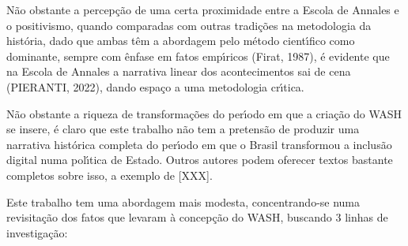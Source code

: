 \documentclass[
12pt,		%
openright,	%
twoside,  %
a4paper,			%
chapter=TITLE,		%
english,			%
french,				%
spanish,			%
brazil				%
]{USPSC-classe/USPSC_RedarTex}
\begin{document}
\noindent\begin{center}\mbox{\centering{}}\end{center}


N\~ao obstante a percep\c{c}\~ao de uma certa proximidade entre a Escola de Annales e o positivismo, quando comparadas com outras tradi\c{c}\~oes na metodologia da hist\'oria, dado que ambas t\^em a abordagem pelo m\'etodo cient\'{\i}fico como dominante, sempre com \^enfase em fatos emp\'{\i}ricos (Firat, 1987), \'e evidente que na Escola de Annales a narrativa linear dos acontecimentos sai de cena (PIERANTI, 2022), dando espa\c{c}o a uma metodologia cr\'{\i}tica.










N\~ao obstante a riqueza de transforma\c{c}\~oes do per\'{\i}odo em que a cria\c{c}\~ao do WASH se insere, \'e claro que este trabalho n\~ao tem a pretens\~ao de produzir uma narrativa hist\'orica completa do per\'{\i}odo em que o Brasil transformou a inclus\~ao digital numa pol\'{\i}tica de Estado. Outros autores podem oferecer textos bastante completos sobre isso, a exemplo de [XXX].










Este trabalho tem uma abordagem mais modesta, concentrando-se numa revisita\c{c}\~ao dos fatos que levaram \`a concep\c{c}\~ao do WASH, buscando 3 linhas de investiga\c{c}\~ao:
\end{document}
